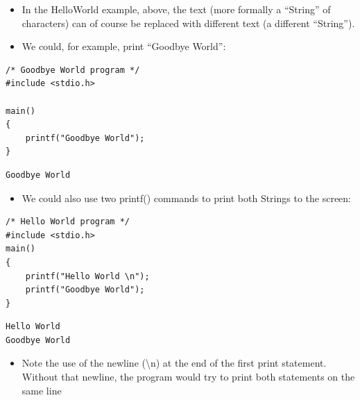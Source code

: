 \documentclass{beamer}
\begin{document}
\begin{frame}[fragile]

\begin{itemize}
\item In the HelloWorld example, above, the text (more formally a ``String'' of characters) can of course be replaced
with different text (a different ``String'').
\item We could, for example, print ``Goodbye World'':
\end{itemize}

\begin{block}{}
\begin{lstlisting}
/* Goodbye World program */
#include <stdio.h>

main()
{
	printf("Goodbye World");
}
\end{lstlisting}
\end{block}

\begin{block}{}
\begin{lstlisting}
Goodbye World
\end{lstlisting}
\end{block}

\end{frame}

\begin{frame}[fragile]
 
\begin{itemize}
\item We could also use two printf() commands to print both Strings to the screen:
\end{itemize}

 \begin{block}{}
\begin{lstlisting}
/* Hello World program */
#include <stdio.h>
main()
{
	printf("Hello World \n");
	printf("Goodbye World");
}
\end{lstlisting}
\end{block}

\begin{block}{}
\begin{lstlisting}
Hello World
Goodbye World
\end{lstlisting}
\end{block}

\begin{itemize}
\item Note the use of the newline (\textbackslash n) at the end of the first print statement. Without that newline, the program would try to print both statements on the same line
\end{itemize}

\end{frame}
\end{document}
